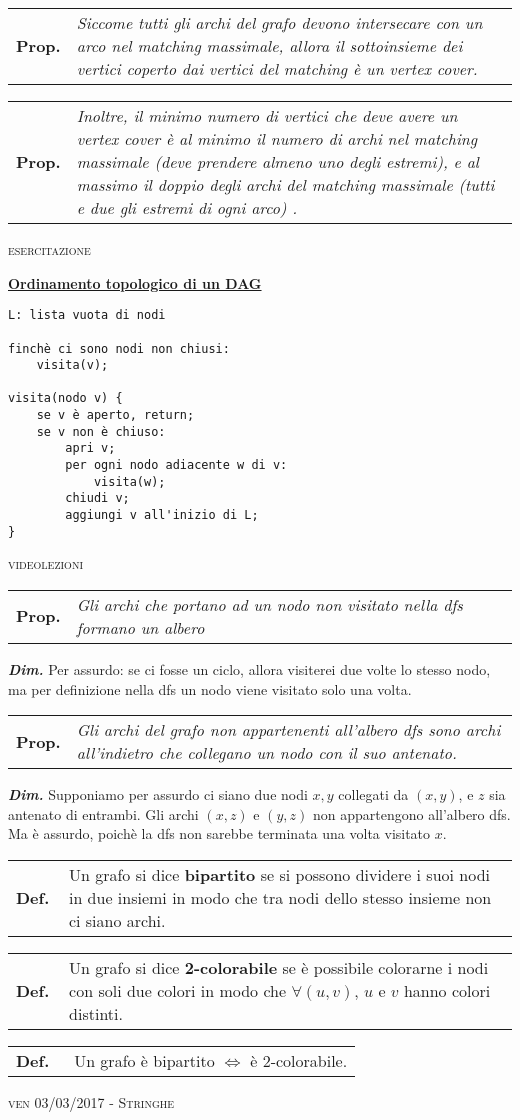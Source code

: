 \documentclass[a4paper,10pt]{article} %
\newcommand{\dimo}[1]{%
    \smallbreak \par \hfill\begin{minipage}{0.92\linewidth}{ \scriptsize {\textbf{\em{Dim.}}} {#1} }\end{minipage} \smallskip \par}
\newcommand{\malgorithm}[1]{%
    {\bigbreak \par \hspace*{4pt} \underline{\textbf {#1}}}}
\newcommand{\msection}[1]{%
    {\newpage\bigbreak \bigbreak \par \hfil \huge \textsc {#1}}\par}
\renewcommand{\b}[1]{%
    {\textbf{#1}}}
\newcommand{\mdef}[1]{%
    {\smallbreak\par\begin{tabular}{ll} \textbf{Def.$\;\;$} & \begin{minipage}[t]{0.80\columnwidth}\normalsize  {#1}\end{minipage}\tabularnewline \end{tabular}}\smallskip\par}
\newcommand{\mprop}[1]{%
    {\smallbreak\par\begin{tabular}{ll} \textbf{Prop.} & \begin{minipage}[t]{0.8\columnwidth}\emph  {#1}\end{minipage}\tabularnewline \end{tabular}}\smallskip\par}
\begin{document}
\mprop{Siccome tutti gli archi del grafo devono intersecare con un arco nel matching massimale, allora il sottoinsieme dei vertici coperto dai vertici del matching è un vertex cover. }
\mprop{Inoltre, il minimo numero di vertici che deve avere un vertex cover è al minimo il numero di archi nel matching massimale (deve prendere almeno uno degli estremi), e al massimo il doppio degli archi del matching massimale (tutti e due gli estremi di ogni arco) .}



\msection{esercitazione}


\malgorithm{Ordinamento topologico di un DAG}
\begin{lstlisting}
L: lista vuota di nodi

finchè ci sono nodi non chiusi:
    visita(v);

visita(nodo v) {
    se v è aperto, return;
    se v non è chiuso:
        apri v;
        per ogni nodo adiacente w di v:
            visita(w);
        chiudi v;
        aggiungi v all'inizio di L;
}
\end{lstlisting}

\medbreak





\msection{videolezioni}





\mprop{Gli archi che portano ad un nodo non visitato nella dfs formano un albero}
\dimo{Per assurdo: se ci fosse un ciclo, allora visiterei due volte lo stesso nodo, ma per definizione nella dfs un nodo viene visitato solo una volta.}


\mprop{Gli archi del grafo non appartenenti all'albero dfs sono archi all'indietro che collegano un nodo con il suo antenato.}
\dimo{Supponiamo per assurdo ci siano due nodi $x, y$ collegati da $(x,y)$, e $z$ sia antenato di entrambi. Gli archi $(x,z)$ e $(y,z)$ non appartengono all'albero dfs. Ma è assurdo, poichè la dfs non sarebbe terminata una volta visitato $x$.}

\mdef{Un grafo si dice \b{bipartito} se si possono dividere i suoi nodi in due insiemi in modo che tra nodi dello stesso insieme non ci siano archi.}
\mdef{Un grafo si dice \b{2-colorabile} se è possibile colorarne i nodi con soli due colori in modo che $\forall (u,v)$, $u$ e $v$ hanno colori distinti.}
\mdef{Un grafo è bipartito \quad $\Leftrightarrow$ \quad è 2-colorabile.}



\msection{ven 03/03/2017 - Stringhe}
\end{document}
